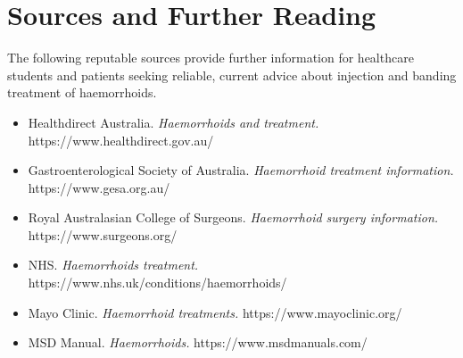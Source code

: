 \section*{Sources and Further Reading}
The following reputable sources provide further information for healthcare students and patients seeking reliable, current advice about injection and banding treatment of haemorrhoids.
\begin{itemize}
    \item Healthdirect Australia. \textit{Haemorrhoids and treatment.} https://www.healthdirect.gov.au/
    \item Gastroenterological Society of Australia. \textit{Haemorrhoid treatment information.} https://www.gesa.org.au/
    \item Royal Australasian College of Surgeons. \textit{Haemorrhoid surgery information.} https://www.surgeons.org/
    \item NHS. \textit{Haemorrhoids treatment.} https://www.nhs.uk/conditions/haemorrhoids/
    \item Mayo Clinic. \textit{Haemorrhoid treatments.} https://www.mayoclinic.org/
    \item MSD Manual. \textit{Haemorrhoids.} https://www.msdmanuals.com/
\end{itemize}
